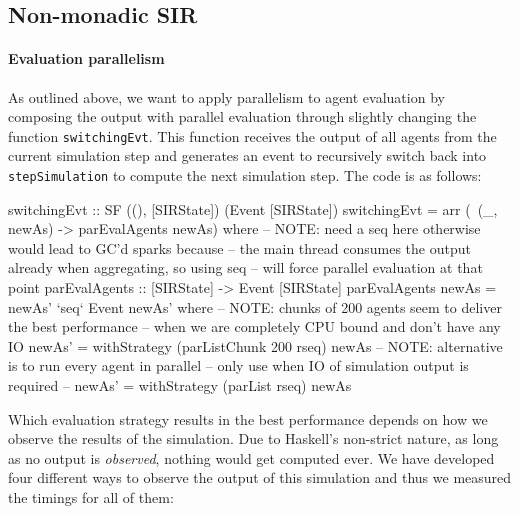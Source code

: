 \subsection{Non-monadic SIR}
\label{parallel_nonmonadic_sir}

\paragraph{Evaluation parallelism}
As outlined above, we want to apply parallelism to agent evaluation by composing the output with parallel evaluation through slightly changing the function \texttt{switchingEvt}. This function receives the output of all agents from the current simulation step and generates an event to recursively switch back into \texttt{stepSimulation} to compute the next simulation step. The code is as follows:

\begin{HaskellCode}
switchingEvt :: SF ((), [SIRState]) (Event [SIRState])
switchingEvt = arr (\ (_, newAs) -> parEvalAgents newAs)
  where
    -- NOTE: need a seq here otherwise would lead to GC'd sparks because
    -- the main thread consumes the output already when aggregating, so using seq 
    -- will force parallel evaluation at that point 
    parEvalAgents :: [SIRState] -> Event [SIRState]
    parEvalAgents newAs = newAs' `seq` Event newAs' 
      where
        -- NOTE: chunks of 200 agents seem to deliver the best performance
        -- when we are completely CPU bound and don't have any IO
        newAs' = withStrategy (parListChunk 200 rseq) newAs
        -- NOTE: alternative is to run every agent in parallel
        -- only use when IO of simulation output is required
        -- newAs' = withStrategy (parList rseq) newAs
\end{HaskellCode}

Which evaluation strategy results in the best performance depends on how we observe the results of the simulation. Due to Haskell's non-strict nature, as long as no output is \textit{observed}, nothing would get computed ever. We have developed four different ways to observe the output of this simulation and thus we measured the timings for all of them:

